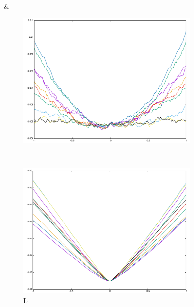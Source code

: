 \begin{figure}[H]
\begin{subfigure}{.33\textwidth}
\end{subfigure}&
\begin{subfigure}{.33\textwidth}
	\includegraphics[width=\linewidth]{fig/ajherr/t2/S_chi.pdf}
\end{subfigure}\\
\begin{subfigure}{.33\textwidth}
	\includegraphics[width=\linewidth]{fig/ajherr/t2/L_mae.pdf}
	\caption{L}
\end{subfigure}%
\begin{subfigure}{.33\textwidth}

\end{subfigure}
\end{figure}
